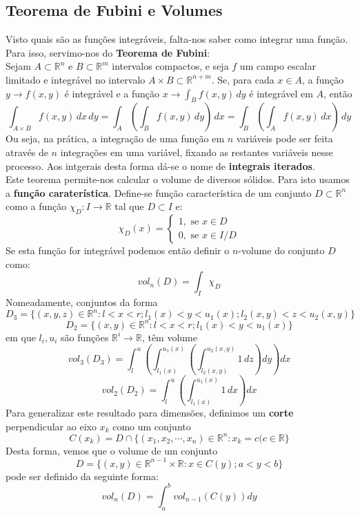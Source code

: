 \documentclass{article}
\newcommand{\R}{\mathbb{R}}
\begin{document}
\subsection{Teorema de Fubini e Volumes}
Visto quais são as funções integráveis, falta-nos saber como integrar uma função. Para isso, servimo-nos do \textbf{Teorema de Fubini}:\\
Sejam $A \subset \R^n$ e $B \subset \R^m$ intervalos compactos, e seja $f$ um campo escalar limitado e integrável no intervalo $A \times B \subset \R^{n+m}$. Se, para cada $x \in A$, a função $y \to f(x,y)$ é integrável e a função $x \to \int_B f(x,y) \, dy$ é integrável em $A$, então
$$
\int_{A \times B} f(x,y) \, dx \, dy = \int_A \left( \int_B f(x,y) \, dy \right) \, dx = \int_B \left( \int_A f(x,y) \, dx \right) \, dy
$$
Ou seja, na prática, a integração de uma função em $n$ variáveis pode ser feita através de $n$ integrações em uma variável, fixando as restantes variáveis nesse processo. Aos intgerais desta forma dá-se o nome de \textbf{integrais iterados}.\\
Este teorema permite-nos calcular o volume de diversos sólidos. Para isto usamos a \textbf{função caraterística}. Define-se função característica de um conjunto $D \subset \R^n$ como a função $\chi_D: I \to \R$ tal que $D \subset I$ e:
$$
\chi _D(x) = 
\begin{cases}
1, \text{ se } x \in D \\
0, \text{ se } x \in I/D
\end{cases}
$$
Se esta função for integrável podemos então definir o $n$-volume do conjunto $D$ como:
$$
vol_n(D) = \int_I \chi _D
$$
Nomeadamente, conjuntos da forma
$$
D_3 = \{ (x,y,z) \in \R^n: l<x<r; l_1(x) < y < u_1(x); l_2(x, y) < z < u_2(x,y) \}
$$
$$
D_2 = \{ (x,y) \in \R^n: l<x<r; l_1(x) < y < u_1(x) \}
$$
em que $l_i, u_i$ são funções $\R^i \to \R$, têm volume
$$
vol_3(D_3) = \int_l^u \left( \int_{l_1(x)}^{u_1(x)} \left( \int_{l_2(x,y)}^{u_2(x,y)} 1 \, dz \right) dy \right) dx
$$
$$
vol_2(D_2) = \int_l^u \left( \int_{l_1(x)}^{u_1(x)} 1 \, dx \right) dx
$$
Para generalizar este resultado para dimensões, definimos um \textbf{corte} perpendicular ao eixo $x_k$ como um conjunto
$$
C(x_k) = D \cap \{ (x_1, x_2, \cdots, x_n) \in \R^n : x_k = c (c \in \R \}
$$
Desta forma, vemos que o volume de um conjunto 
$$
D = \{ (x,y) \in \R^{n-1} \times \R: x \in C(y) ; a < y < b \}
$$ 
pode ser definido da seguinte forma:
$$
vol_n(D) = \int_a^b vol_{n-1}(C(y)) dy
$$
\end{document}
